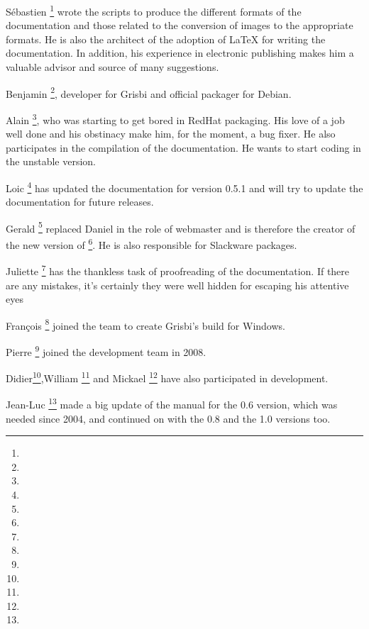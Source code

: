 {Sébastien }\footnote{\urlSebastienBlondeelEmail{}} wrote the scripts to produce the different formats of the documentation and those related to the conversion of images to the appropriate formats. He is also the architect of the adoption of \gls{LaTeX} for writing the documentation. In addition, his experience in electronic publishing makes him a valuable advisor and source of many suggestions.

{Benjamin }\footnote{\urlBenjaminDrieuEmail{}}, developer for Grisbi and official packager for \gls{Debian}.

{Alain }\footnote{\urlDionysosEmail{}}, who was starting to get bored in \gls{RedHat} packaging. His love of a job well done and his obstinacy make him, for the moment, a bug fixer. He also participates in the compilation of the documentation. He wants to start coding in the unstable version.

{Loic }\footnote{\urlLoicBreillouxEmail{}} has updated the documentation for version 0.5.1 and will try to update the documentation for future releases.

{Gerald }\footnote{\urlGeraldNielEmail{}} replaced {Daniel } in the role of webmaster and is therefore the creator of the new version of \footnote{\urlGrisbi{}}. He is also responsible for \gls{Slackware} packages.

{Juliette }\footnote{\urlJulietteEmail{}} has the thankless task of proofreading of the documentation. If there are any mistakes, it's certainly they were well hidden for escaping his attentive eyes

{François }\footnote{\urlFrancoisTerrotEmail{}} joined the team to create Grisbi's \gls{build} for Windows.

{Pierre }\footnote{\urlPierreBiavaEmail{}} joined the development team in 2008.

{Didier}\footnote{\urlDidierChevalierEmail{}},{William }\footnote{\urlWilliamOllivierEmail{}} and {Mickael }\footnote{\urlMickaelRemarsEmail{}} have also participated in development.

{Jean-Luc }\footnote{\urlJeanLucDuflotEmail{}} made a big update of the manual for the 0.6 version, which was needed since 2004, and continued on with the 0.8 and the 1.0 versions too.

